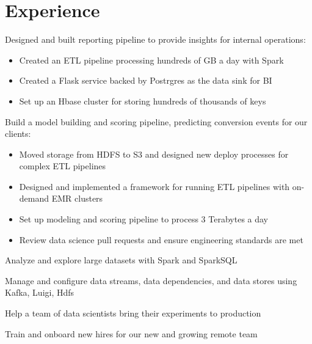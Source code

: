 \documentclass[]{deedy-resume-openfont}
\begin{document}
\section{Experience}
\vspace{\topsep} %
\vspace{\topsep} %
\begin{tightemize}
\item Designed and built reporting pipeline to provide insights for internal operations:
  \begin{itemize}
  \item Created an ETL pipeline processing hundreds of GB a day with Spark
  \item Created a Flask service backed by Postrgres as the data sink for BI
  \item Set up an Hbase cluster for storing hundreds of thousands of keys
  \end{itemize}
\item Build a model building and scoring pipeline, predicting conversion events for our clients:
  \begin{itemize}
  \item Moved storage from HDFS to S3 and designed new deploy processes for complex ETL pipelines
  \item Designed and implemented a framework for running ETL pipelines with on-demand EMR clusters
  \item Set up modeling and scoring pipeline to process 3 Terabytes a day
  \item Review data science pull requests and ensure engineering standards are met
  \end{itemize}
\item Analyze and explore large datasets with Spark and SparkSQL
\item Manage and configure data streams, data dependencies, and data stores using Kafka, Luigi, Hdfs
\item Help a team of data scientists bring their experiments to production
\item Train and onboard new hires for our new and growing remote team
\end{tightemize}
\sectionsep
\end{document}
